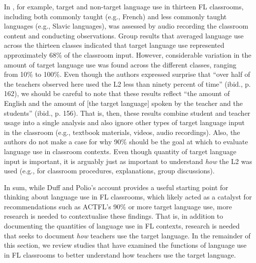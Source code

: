 \documentclass[output=paper,chinesefont]{langscibook}
\begin{document}
In \citet{DuffPolio1990}, for example, target and non-target language use in thirteen FL classrooms, including both commonly taught (e.g., French) and less commonly taught languages (e.g., Slavic languages), was assessed by audio recording the classroom content and conducting observations. Group results that averaged language use across the thirteen classes indicated that target language use represented approximately 68\% of the classroom input. However, considerable variation in the amount of target language use was found across the different classes, ranging from 10\% to 100\%. Even though the authors expressed surprise that ``over half of the teachers observed here used the L2 less than ninety percent of time'' (ibid., p. 162), we should be careful to note that these results reflect ``the amount of English and the amount of [the target language] spoken by the teacher and the students'' (ibid., p. 156). That is, then, these results combine student and teacher usage into a single analysis and also ignore other types of target language input in the classroom (e.g., textbook materials, videos, audio recordings). Also, the authors do not make a case for why 90\% should be the goal at which to evaluate language use in classroom contexts. Even though quantity of target language input is important, it is arguably just as important to understand  \textit{how} the L2 was used (e.g., for classroom procedures, explanations, group discussions). 

In sum, while Duff and Polio’s account provides a useful starting point for thinking about language use in FL classrooms, which likely acted as a catalyst for recommendations such as ACTFL’s 90\% or more target language use, more research is needed to contextualise these findings. That is, in addition to documenting the quantities of language use in FL contexts, research is needed that seeks to document \textit{how} teachers use the target language. In the remainder of this section, we review studies that have examined the functions of language use in FL classrooms to better understand how teachers use the target language. 
\end{document}
